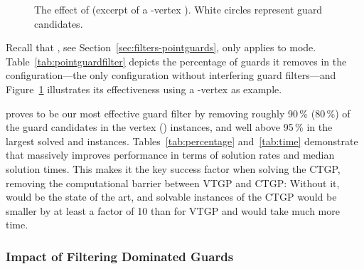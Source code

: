 \begin{figure}
	\hfill
	\caption{The effect of \pointguardfilter (excerpt of a -vertex \parabolawalk).
		White circles represent guard candidates.}
	\label{fig:filtering-effect}
\end{figure}

Recall that \pointguardfilter, see Section~\ref{sec:filters-pointguards}, only applies to \pointguardmode mode.
Table~\ref{tab:pointguardfilter} depicts the percentage of guards it removes in the \pnodom configuration\dash---the only configuration without interfering guard filters\dash---and Figure~\ref{fig:filtering-effect} illustrates its effectiveness using a -vertex \parabolawalk as example.

\pointguardfilter proves to be our most effective guard filter by removing roughly 90\,\% (80\,\%) of the guard candidates in the  vertex \walk (\concavevalleys) instances, and well above 95\,\% in the largest solved \sinewalk and \parabolawalk instances.
Tables~\ref{tab:percentage} and~\ref{tab:time} demonstrate that \pointguardfilter massively improves performance in terms of solution rates and median solution times.
This makes it the key success factor when solving the \ac{CTGP}, removing the computational barrier between \ac{VTGP} and \ac{CTGP}:
Without it, \pnoedge would be the state of the art, and solvable instances of the \ac{CTGP} would be smaller by at least a factor of 10 than for \ac{VTGP} and would take much more time.

\subsubsection{Impact of Filtering Dominated Guards}
\label{sec:experiments-dom}

